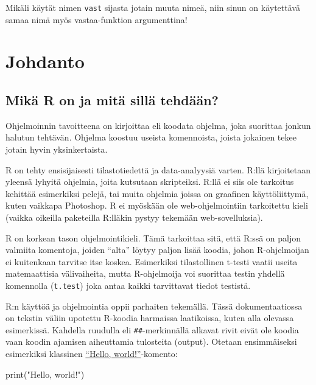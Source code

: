 \documentclass[
]{book}
\newenvironment{Shaded}{\begin{snugshade}}{\end{snugshade}}
\newcommand{\FunctionTok}[1]{\textcolor[rgb]{0.00,0.00,0.00}{#1}}
\newcommand{\NormalTok}[1]{#1}
\newcommand{\StringTok}[1]{\textcolor[rgb]{0.31,0.60,0.02}{#1}}
\begin{document}
Mikäli käytät nimen \texttt{vast} sijasta jotain muuta nimeä, niin sinun on käytettävä samaa nimä myös vastaa-funktion argumenttina!

\hypertarget{intro}{%
\chapter{Johdanto}\label{intro}}

\hypertarget{what_R}{%
\section{Mikä R on ja mitä sillä tehdään?}\label{what_R}}

Ohjelmoinnin tavoitteena on kirjoittaa eli koodata ohjelma, joka suorittaa jonkun halutun tehtävän. Ohjelma koostuu useista komennoista, joista jokainen tekee jotain hyvin yksinkertaista.

R on tehty ensisijaisesti tilastotiedettä ja data-analyysiä varten. R:llä kirjoitetaan yleensä lyhyitä ohjelmia, joita kutsutaan skripteiksi. R:llä ei siis ole tarkoitus kehittää esimerkiksi pelejä, tai muita ohjelmia joissa on graafinen käyttöliittymä, kuten vaikkapa Photoshop. R ei myöskään ole web-ohjelmointiin tarkoitettu kieli (vaikka oikeilla paketeilla R:lläkin pystyy tekemään web-sovelluksia).

R on korkean tason ohjelmointikieli. Tämä tarkoittaa sitä, että R:ssä on paljon valmiita komentoja, joiden ``alta'' löytyy paljon lisää koodia, johon R-ohjelmoijan ei kuitenkaan tarvitse itse koskea. Esimerkiksi tilastollinen t-testi vaatii useita matemaattisia välivaiheita, mutta R-ohjelmoija voi suorittaa testin yhdellä komennolla (\texttt{t.test}) joka antaa kaikki tarvittavat tiedot testistä.

R:n käyttöä ja ohjelmointia oppii parhaiten tekemällä. Tässä dokumentaatiossa on tekstin väliin upotettu R-koodia harmaissa laatikoissa, kuten alla olevassa esimerkissä. Kahdella ruudulla eli \texttt{\#\#}-merkinnällä alkavat rivit eivät ole koodia vaan koodin ajamisen aiheuttamia tulosteita (output). Otetaan ensimmäiseksi esimerkiksi klassinen \href{https://en.wikipedia.org/wiki/\%22Hello,_World!\%22_program}{``Hello, world!''}-komento:

\begin{Shaded}
\begin{Highlighting}[]
\FunctionTok{print}\NormalTok{(}\StringTok{"Hello, world!"}\NormalTok{)}
\end{Highlighting}
\end{Shaded}
\end{document}
